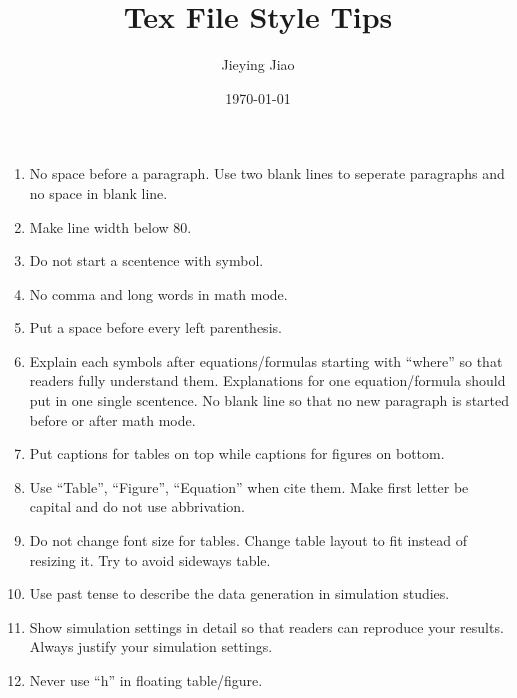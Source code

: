 \documentclass[12pt, letterpaper]{article}
\title{Tex File Style Tips}
\author{Jieying Jiao}
\date{\today}
\begin{document}
\maketitle
\begin{enumerate}
    \item No space before a paragraph. Use two blank lines to seperate paragraphs 
    and no space in blank line.
    \item Make line width below 80. 
    \item Do not start a scentence with symbol.
    \item No comma and long words in math mode.
    \item Put a space before every left parenthesis.
    \item Explain each symbols after equations/formulas starting with ``where'' 
    so that readers fully understand them. Explanations for one equation/formula 
    should put in one single scentence. No blank line so that no new paragraph 
    is started before or after math mode.
    \item Put captions for tables on top while captions for figures on bottom.
    \item Use ``Table'', ``Figure'', ``Equation'' when cite them. Make first letter 
    be capital and do not use abbrivation.
    \item Do not change font size for tables. Change table layout to fit instead 
    of resizing it. Try to avoid sideways table.
    \item Use past tense to describe the data generation in simulation studies.
    \item Show simulation settings in detail so that readers can reproduce your 
    results. Always justify your simulation settings.
    \item Never use ``h'' in floating table/figure.
\end{enumerate}
\end{document}
